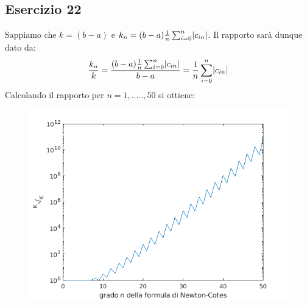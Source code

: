 \subsection{Esercizio 22}
Sappiamo che $k = (b-a)$ e $k_n=(b-a)\frac{1}{n}\sum_{i=0}^{n}\lvert c_{in}\rvert$. Il rapporto sarà dunque dato da: \[\dfrac{k_n}{k} = 
\dfrac{(b-a)\frac{1}{n}\sum_{i=0}^{n}\lvert c_{in}\rvert}{b-a} = \frac{1}{n}\sum_{i=0}^{n}\lvert c_{in}\rvert \]
Calcolando il rapporto per $n = 1,.....,50$ si ottiene:
\begin{figure}
    \includegraphics[width = \linewidth]{capitolo5/ncotes.png}
\end{figure}
